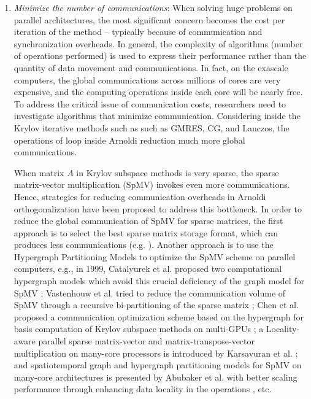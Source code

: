 {\begin{enumerate}[label=(\arabic*)]
    \item \textit{Minimize the number of communications}: When solving huge problems on parallel architectures, the most significant concern becomes the cost per iteration of the method -- typically because of communication and synchronization overheads. In general, the complexity of algorithms (number of operations performed) is used to express their performance rather than the quantity of data movement and communications. In fact, on the exascale computers, the global communications across millions of cores are very expensive, and the computing operations inside each core will be nearly free. To address the critical issue of communication costs, researchers need to investigate algorithms that minimize communication. Considering inside the Krylov iterative methods such as such as GMRES, CG, and Lanczos, the operations of loop inside Arnoldi reduction much more global communications. 
	
    When matrix $A$ in Krylov subspace methods is very sparse, the sparse matrix-vector multiplication (SpMV) invokes even more communications. Hence, strategies for reducing communication overheads in Arnoldi orthogonalization have been proposed to address this bottleneck. In order to reduce the global communication of SpMV for sparse matrices, the first approach is to select the best sparse matrix storage format, which can produces less communications (e.g. \cite{montagne2004optimal, liu2015csr5,stathis2003hierarchical,merrill2016merge,bell2008efficient, bell2009implementing,kreutzer2014unified,ashari2014efficient}). Another approach is to use the Hypergraph Partitioning Models to optimize the SpMV scheme on parallel computers, e.g., in 1999, Catalyurek et al. proposed two computational hypergraph models which avoid this crucial deficiency of the graph model for SpMV \cite{catalyurek1999hypergraph}; Vastenhouw et al. tried to reduce the communication volume of SpMV through a recursive bi-partitioning of the sparse matrix \cite{vastenhouw2005two}; Chen et al. proposed a communication optimization scheme based on the hypergraph for basis computation of Krylov subspace methods on multi-GPUs \cite{chen2014communication}; a Locality-aware parallel sparse matrix-vector and matrix-transpose-vector multiplication on many-core processors is introduced by Karsavuran et al. \cite{karsavuran2016locality}; and spatiotemporal graph and hypergraph partitioning models for SpMV on many-core architectures is presented by Abubaker et al. with better scaling performance through enhancing data locality in the operations \cite{abubaker2018spatiotemporal}, etc.
	

\end{enumerate}}

